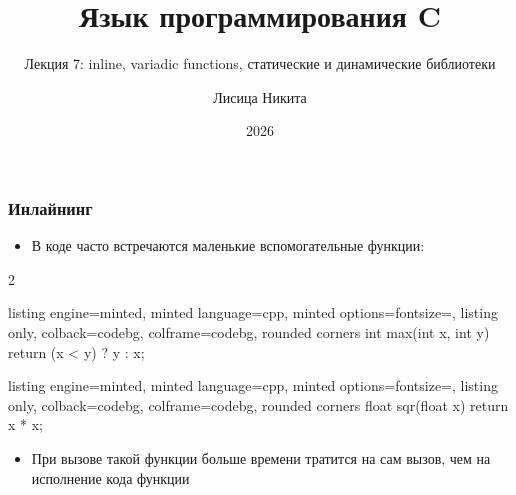 \documentclass[10pt]{beamer}
\title{Язык программирования C}
\subtitle{Лекция 7: inline, variadic functions, статические и динамические библиотеки}
\author{Лисица Никита}
\date{2026}
\begin{document}
\frame{\titlepage}



\begin{frame}[fragile]
\frametitle{Инлайнинг}
\begin{itemize}
\item В коде часто встречаются маленькие вспомогательные функции:
\end{itemize}
\begin{multicols}{2}
\begin{tcblisting}{listing engine=minted, minted language=cpp, minted options={fontsize=\scriptsize}, listing only, colback=codebg, colframe=codebg, rounded corners}
int max(int x, int y) {
  return (x < y) ? y : x;
}
\end{tcblisting}
\columnbreak
\begin{tcblisting}{listing engine=minted, minted language=cpp, minted options={fontsize=\scriptsize}, listing only, colback=codebg, colframe=codebg, rounded corners}
float sqr(float x) {
  return x * x;
}
\end{tcblisting}
\end{multicols}
\pause
\begin{itemize}
\item При вызове такой функции больше времени тратится на сам вызов, чем на исполнение кода функции
\end{itemize}
\end{frame}
\end{document}
